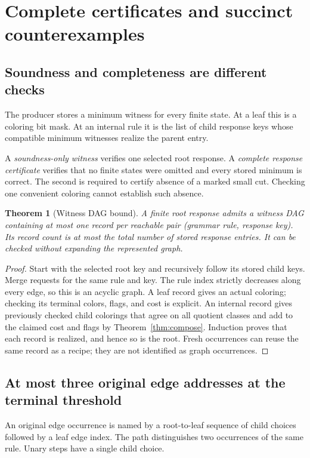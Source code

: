 \documentclass[11pt,a4paper]{article}
\newtheorem{theorem}{Theorem}[section]
\theoremstyle{definition}
\theoremstyle{remark}
\begin{document}
\section{Complete certificates and succinct counterexamples}
\label{sec:certificates}
\subsection{Soundness and completeness are different checks}
The producer stores a minimum witness for every finite state. At a leaf this is a coloring bit mask. At an internal rule it is the list of child response keys whose compatible minimum witnesses realize the parent entry.

A \emph{soundness-only witness} verifies one selected root response. A \emph{complete response certificate} verifies that no finite states were omitted and every stored minimum is correct. The second is required to certify absence of a marked small cut. Checking one convenient coloring cannot establish such absence.

\begin{theorem}[Witness DAG bound]
\label{thm:witness}
A finite root response admits a witness DAG containing at most one record per reachable pair (grammar rule, response key). Its record count is at most the total number of stored response entries. It can be checked without expanding the represented graph.
\end{theorem}
\begin{proof}
Start with the selected root key and recursively follow its stored child keys. Merge requests for the same rule and key. The rule index strictly decreases along every edge, so this is an acyclic graph. A leaf record gives an actual coloring; checking its terminal colors, flags, and cost is explicit. An internal record gives previously checked child colorings that agree on all quotient classes and add to the claimed cost and flags by Theorem~\ref{thm:compose}. Induction proves that each record is realized, and hence so is the root. Fresh occurrences can reuse the same record as a recipe; they are not identified as graph occurrences.
\end{proof}

\subsection{At most three original edge addresses at the terminal threshold}
An original edge occurrence is named by a root-to-leaf sequence of child choices followed by a leaf edge index. The path distinguishes two occurrences of the same rule. Unary steps have a single child choice.
\end{document}
